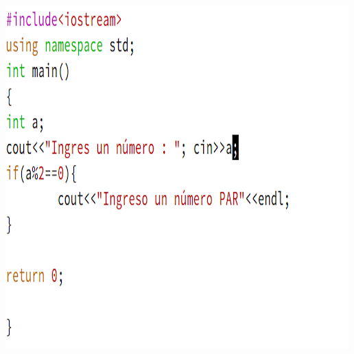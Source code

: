 \documentclass[presentation, aspectratio=54]{beamer}
\begin{document}
\begin{enumerate}
\begin{center}
\includegraphics[width=.9\linewidth]{./images/codigo/code-if.png}
\end{center}
\end{enumerate}
\end{document}
